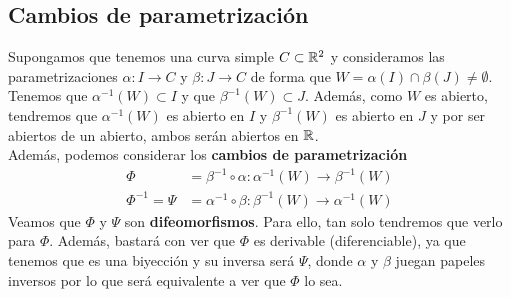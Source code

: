 \subsection{Cambios de parametrización}

\begin{ejemplo}\label{ej:cambio}
    Supongamos que tenemos una curva simple $C\subset \mathbb{R}^2$ y consideramos las parametrizaciones $\alpha: I \to C$ y $\beta:J \to C$ de forma que $W = \alpha(I)\cap \beta(J)\neq \emptyset$.\\

    Tenemos que $\alpha^{-1}(W)\subset I$ y que $\beta^{-1}(W)\subset J$. Además, como $W$ es abierto, tendremos que $\alpha^{-1}(W)$ es abierto en $I$ y $\beta^{-1}(W)$ es abierto en $J$ y por ser abiertos de un abierto, ambos serán abiertos en $\mathbb{R}$.\\

    Además, podemos considerar los \textbf{cambios de parametrización}
    \begin{align*}
        \Phi &= \beta^{-1}\circ \alpha : \alpha^{-1}(W) \to \beta^{-1}(W)\\
        \Phi^{-1} = \Psi &= \alpha^{-1}\circ \beta : \beta^{-1}(W) \to \alpha^{-1}(W)
    \end{align*}
    Veamos que $\Phi$ y $\Psi$ son \textbf{difeomorfismos}. Para ello, tan solo tendremos que verlo para $\Phi$. Además, bastará con ver que $\Phi$ es derivable (diferenciable), ya que tenemos que es una biyección y su inversa será $\Psi$, donde $\alpha$ y $\beta$ juegan papeles inversos por lo que será equivalente a ver que $\Phi$ lo sea.\\


\end{ejemplo}
